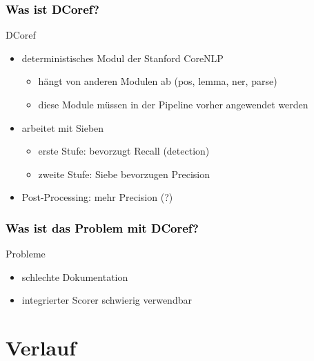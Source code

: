 \documentclass[xcolor=dvipsnames]{beamer}
\begin{document}
\begin{frame}\frametitle{\textcolor{black}{Was ist DCoref?}}

\begin{block}{DCoref}
\begin{itemize}
\item deterministisches Modul der Stanford CoreNLP
\begin{itemize}
\item hängt von anderen Modulen ab (pos, lemma, ner, parse)
\item diese Module müssen in der Pipeline vorher angewendet werden
\end{itemize}
\item arbeitet mit Sieben
\begin{itemize}
\item erste Stufe: bevorzugt Recall (detection)
\item zweite Stufe: Siebe bevorzugen Precision
\end{itemize} 
\item Post-Processing: mehr Precision (?)
\end{itemize}
\end{block}

\end{frame}

\begin{frame}\frametitle{\textcolor{black}{Was ist das Problem mit DCoref?}}

\begin{block}{Probleme}
\begin{itemize}
  \item schlechte Dokumentation
  \item integrierter Scorer schwierig verwendbar
\end{itemize}
\end{block}

\end{frame}


\section{Verlauf}

\end{document}
